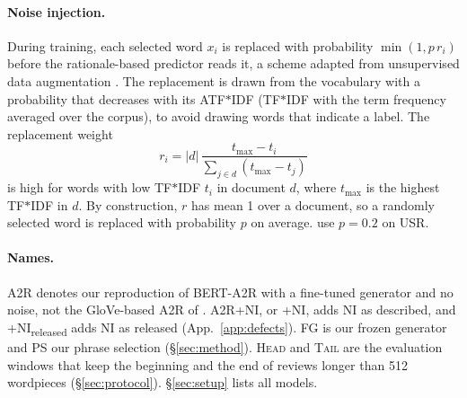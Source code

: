 \documentclass[11pt]{article}
\newcommand{\HEAD}{\textup{\textsc{Head}}}
\newcommand{\TAIL}{\textup{\textsc{Tail}}}
\newcommand{\tfidf}{TF$\ast$IDF}
\begin{document}
\paragraph{Noise injection.} During training, each selected word $x_i$ is replaced with probability $\min(1, p\,r_i)$ before the rationale-based predictor reads it, a scheme adapted from unsupervised data augmentation \citep{xie2020uda}. The replacement is drawn from the vocabulary with a probability that decreases with its ATF$\ast$IDF (\tfidf{} with the term frequency averaged over the corpus), to avoid drawing words that indicate a label. The replacement weight
\begin{equation}
  r_i = |d| \, \frac{t_{\max} - t_i}{\sum_{j \in d} (t_{\max} - t_j)}
  \label{eq:r}
\end{equation}
is high for words with low \tfidf{} $t_i$ in document $d$, where $t_{\max}$ is the highest \tfidf{} in $d$. By construction, $r$ has mean 1 over a document, so a randomly selected word is replaced with probability $p$ on average. \citet{storek-etal-2023-unsupervised} use $p = 0.2$ on USR.

\paragraph{Names.} A2R denotes our reproduction of BERT-A2R with a fine-tuned generator and no noise, not the GloVe-based A2R of \citet{yu2021understanding}. A2R+NI, or +NI, adds NI as described, and +NI\textsubscript{released} adds NI as released (App.~\ref{app:defects}). FG is our frozen generator and PS our phrase selection (\S\ref{sec:method}). \HEAD{} and \TAIL{} are the evaluation windows that keep the beginning and the end of reviews longer than 512 wordpieces (\S\ref{sec:protocol}). \S\ref{sec:setup} lists all models.
\end{document}
